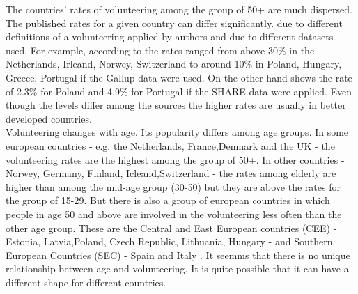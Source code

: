 \documentclass[10pt, letterpaper]{article}
\newcommand{\emd}[1]{\ExecuteMetaData[/tmp/tex]{#1}} %
\begin{document}
\begin{spacing}{1.4} %






The countries' rates of volunteering among the group of 50+ are much dispersed. The published rates for a given country can differ significantly. due to different definitions of a volunteering  applied by authors and due to different datasets used. For example, according to \citet{Oecd16}the rates ranged from above 30\% in the Netherlands, Irleand, Norwey, Switzerland to around 10\% in Poland, Hungary, Greece, Portugal  if the Gallup data were used. On the other hand \citet{Oecd15}shows the rate of 2.3\% for Poland and 4.9\% for Portugal if the SHARE data were applied. Even though the levels differ among the sources the higher rates are usually in better developed countries. \\ 

Volunteering changes with age. Its popularity differs among age groups. In some european countries - e.g. the Netherlands, France,Denmark and the UK  - the volunteering rates are the highest among the group of 50+. In other countries - Norwey, Germany, Finland, Icleand,Switzerland  - the rates among elderly are higher than among the mid-age group (30-50) but they are above the rates for the group of 15-29. But there is also  a group of european countries in which people in age 50 and above are involved in the volunteering less often than the other age group. These are the Central and East European countries (CEE) - Estonia, Latvia,Poland, Czech Republic, Lithuania, Hungary - and  Southern European Countries (SEC) - Spain and Italy \citet{Oecd16}. It seemms that there is no unique relationship between age and volunteering. It is quite possible that it can have a different shape for different countries. \\  


\end{spacing}
\end{document}

